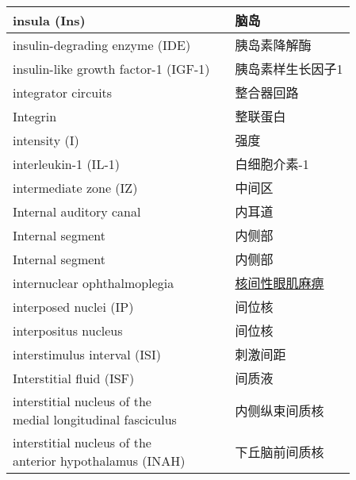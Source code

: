\begin{longtable}{lll}
	\midrule
	insula (Ins)   && 脑岛  \\
	
	\midrule
	insulin-degrading enzyme (IDE)   && 胰岛素降解酶  \\
	
	\midrule
	insulin-like growth factor-1 (IGF-1)   && 胰岛素样生长因子1  \\
	
	\midrule
	integrator circuits  && 整合器回路  \\
	
	\midrule
	Integrin  && 整联蛋白  \\
	
	\midrule
	intensity (I)  && 强度  \\
	
	\midrule
	interleukin-1 (IL-1) && 白细胞介素-1  \\
	
	\midrule
	intermediate zone (IZ)  && 中间区  \\
	
	\midrule
	Internal auditory canal   && 内耳道  \\
	
	\midrule
	Internal segment  && 内侧部  \\
	
	\midrule
	Internal segment  && 内侧部  \\
	
	\midrule
	internuclear ophthalmoplegia  && \href{https://chuangshi.qq.com/read/27611642/12}{核间性眼肌麻痹}  \\
	
	\midrule
	interposed nuclei (IP)  && 间位核  \\
	
	\midrule
	interpositus nucleus  && 间位核  \\
	
	\midrule
	interstimulus interval (ISI)  && 刺激间距  \\
	
	\midrule
	Interstitial fluid (ISF)  && 间质液  \\
	
	\midrule
	\makecell[l]{interstitial nucleus of the \\medial longitudinal fasciculus}   && 内侧纵束间质核  \\
	
	\midrule
	\makecell[l]{interstitial nucleus of the \\anterior hypothalamus  (INAH)} && 下丘脑前间质核  \\
	

\end{longtable}

